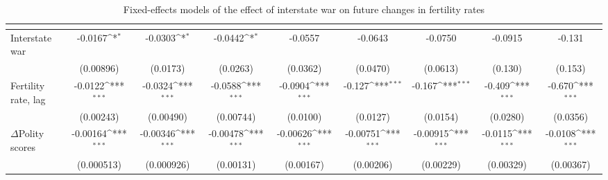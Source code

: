 \begin{table}[htbp]\centering
\def\sym#1{\ifmmode^{#1}\else\(^{#1}\)\fi}
\caption{Fixed-effects models of the effect of interstate war on future changes in fertility rates \label{interwarfertility}}
\begin{tabular}{l*{8}{c}}
\hline\hline
                    &&&&&&&&\\
\hline
Interstate war     &     -0.0167\sym{*}  &     -0.0303\sym{*}  &     -0.0442\sym{*}  &     -0.0557         &     -0.0643         &     -0.0750         &     -0.0915         &      -0.131         \\
                    &   (0.00896)         &    (0.0173)         &    (0.0263)         &    (0.0362)         &    (0.0470)         &    (0.0613)         &     (0.130)         &     (0.153)         \\
[1em]
Fertility rate, lag       &     -0.0122\sym{***}&     -0.0324\sym{***}&     -0.0588\sym{***}&     -0.0904\sym{***}&      -0.127\sym{***}&      -0.167\sym{***}&      -0.409\sym{***}&      -0.670\sym{***}\\
                    &   (0.00243)         &   (0.00490)         &   (0.00744)         &    (0.0100)         &    (0.0127)         &    (0.0154)         &    (0.0280)         &    (0.0356)         \\
[1em]
$\Delta$Polity scores          &    -0.00164\sym{***}&    -0.00346\sym{***}&    -0.00478\sym{***}&    -0.00626\sym{***}&    -0.00751\sym{***}&    -0.00915\sym{***}&     -0.0115\sym{***}&     -0.0108\sym{***}\\
                    &  (0.000513)         &  (0.000926)         &   (0.00131)         &   (0.00167)         &   (0.00206)         &   (0.00229)         &   (0.00329)         &   (0.00367)         \\
[1em]

\end{tabular}
\end{table}
